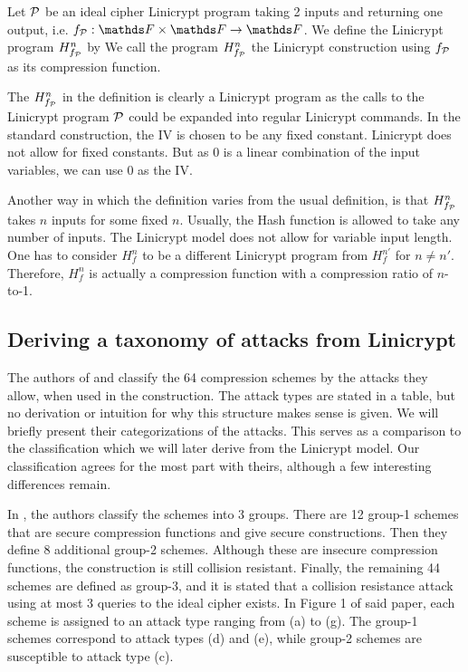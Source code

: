\begin{defn}
    Let $\P$ be an ideal cipher Linicrypt program taking 2 inputs and returning one output, i.e. $f_\P: \F \times \F \to \F$.
    We define the Linicrypt program $H^n_{f_\P}$ by
    We call the program $\PMD{f_\P}$ the Linicrypt \MD construction using $f_\P$ as its compression function.
\end{defn}

The $\PMD{f_\P}$ in the definition is clearly a Linicrypt program as the calls to the Linicrypt program $\P$ could be expanded into regular Linicrypt commands.
In the standard \MD construction, the IV is chosen to be any fixed constant.
Linicrypt does not allow for fixed constants.
But as 0 is a linear combination of the input variables, we can use 0 as the IV.

Another way in which the definition varies from the usual definition,
is that $\PMD{f_\P}$ takes $n$ inputs for some fixed $n$.
Usually, the \MD Hash function is allowed to take any number of inputs.
The Linicrypt model does not allow for variable input length.
One has to consider $H^n_f$ to be a different Linicrypt program from $H^{n'}_f$ for $n \neq n'$.
Therefore, $H^n_f$ is actually a compression function with a compression ratio of $n$-to-1.

\subsection{Deriving a taxonomy of attacks from Linicrypt}

The authors of \cite{C:PreGovVan93} and \cite{C:BlaRogShr02} classify the 64 compression schemes by the attacks they allow,
when used in the \MD construction.
The attack types are stated in a table, but no derivation or intuition for why this structure makes sense is given.
We will briefly present their categorizations of the attacks.
This serves as a comparison to the classification which we will later derive from the Linicrypt model.
Our classification agrees for the most part with theirs,
although a few interesting differences remain.

In \cite{C:BlaRogShr02}, the authors classify the schemes into 3 groups.
There are 12 group-1 schemes that are secure compression functions and give secure \MD constructions.
Then they define 8 additional group-2 schemes.
Although these are insecure compression functions,
the \MD construction is still collision resistant. 
Finally, the remaining 44 schemes are defined as group-3,
and it is stated that a collision resistance attack using at most 3 queries to the ideal cipher exists.
In Figure 1 of said paper, each scheme is assigned to an attack type ranging from (a) to (g).
The group-1 schemes correspond to attack types (d) and (e), while group-2 schemes are susceptible to attack type (c).

